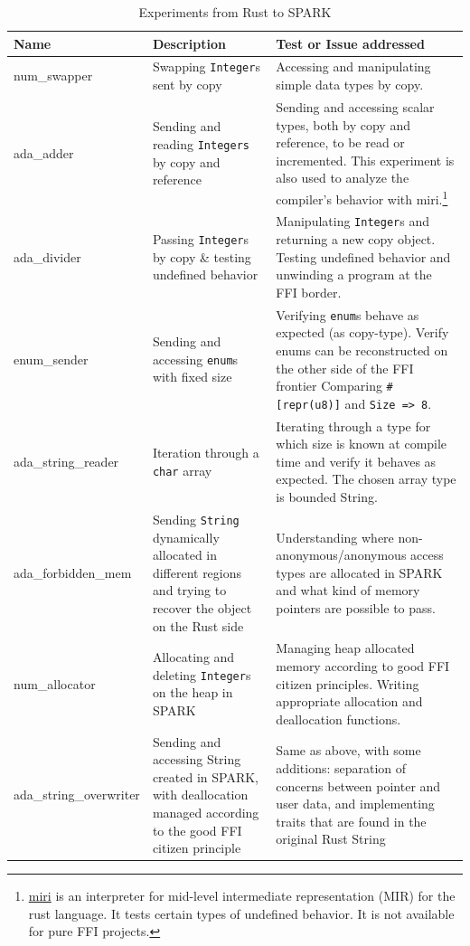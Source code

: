 \documentclass[nomenclature, english, bibtex]{kththesis}
\begin{document}
\begin{table}[ht!]
\footnotesize
\centering
\caption{Experiments from Rust to SPARK}
\label{tab:fromrusttospark}
\begin{tabular}{ |p{3cm}|p{4cm}|p{7cm}| }
\hline
\rowcolor{color1bg_fill}
\hline
\rowcolor{color2bg_fill}
\centering Name & \centering Description & \centering Test or Issue addressed \tabularnewline
\hline
num\_swapper & Swapping \texttt{Integer}s sent by copy & Accessing and manipulating simple data types by copy. \tabularnewline
\hline
ada\_adder & Sending and reading \texttt{Integers} by copy and reference & Sending and accessing scalar types, both by copy and reference, to be read or incremented. This experiment is also used to analyze the compiler's behavior with miri.\footnote{\href{https://github.com/rust-lang/miri/}{miri} is an interpreter for mid-level intermediate representation (MIR) for the rust language. It tests certain types of undefined behavior. It is not available for pure FFI projects.} \tabularnewline
\hline
ada\_divider & Passing \texttt{Integer}s by copy \& testing undefined behavior & Manipulating \texttt{Integer}s and returning a new copy object. \newline Testing undefined behavior and unwinding a program at the FFI border. \tabularnewline
\hline
enum\_sender & Sending and accessing \texttt{enum}s with fixed size & Verifying \texttt{enum}s behave as expected (as \gls{copy-type}). \newline Verify enums can be reconstructed on the other side of the FFI frontier \newline Comparing \texttt{\#[repr(u8)]} and \texttt{Size => 8}. \tabularnewline
\hline
ada\_string\_reader & Iteration through a \texttt{char} array & Iterating through a type for which size is known at compile time and verify it behaves as expected. The chosen array type is bounded String. \tabularnewline
\hline
ada\_forbidden\_mem & Sending \texttt{String} dynamically allocated in different regions and trying to recover the object on the Rust side & Understanding where non-anonymous/anonymous access types are allocated in SPARK and what kind of memory pointers are possible to pass.\tabularnewline
\hline
num\_allocator & Allocating and deleting \texttt{Integer}s on the heap in SPARK & Managing heap allocated memory according to good FFI citizen principles. Writing appropriate allocation and deallocation functions. \tabularnewline
\hline
ada\_string\_overwriter & Sending and accessing String created in SPARK, with deallocation managed according to the good FFI citizen principle & Same as above, with some additions: separation of concerns between pointer and user data, and implementing traits that are found in the original Rust String \tabularnewline
\hline
\end{tabular}
\end{table}
\FloatBarrier
\end{document}
